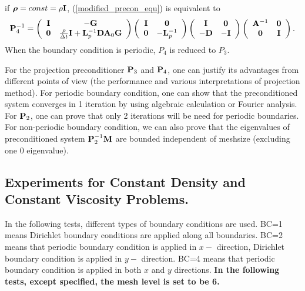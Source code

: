 \documentclass[9pt]{article}
\newcommand{\V}[1]{\boldsymbol{#1}}
\begin{document}
if ${\V {\rho}}=const=\rho {\bf I}$, (\ref{modified_precon_equ}) is equivalent to
\begin{equation}\label{modified_precon_equ}
{\bf P}_4^{-1}=\left(\begin{array}{cc}
{\bf I} & - {\bf G} \\
{\bf 0}      & \frac{\rho}{\Delta t}{\bf I}+{\bf L}_p^{-1} {\bf D} {\bf A}_0 {\bf G}
\end{array}\right)
\left(\begin{array}{cc}
{\bf I}     &  {\bf 0} \\
{\bf 0}     &  -{\bf L}_p^{-1}
\end{array}\right)
\left(\begin{array}{cc}
{\bf I}     &  {\bf 0} \\
-{\bf D}     &  -{\bf I}
\end{array}\right)
\left(\begin{array}{cc}
{\bf A}^{-1}       & {\bf 0} \\
{\bf 0}            & {\bf I}
\end{array}\right).
\end{equation}
When the boundary condition is periodic, $P_4$ is reduced to $P_3$.

For the projection preconditioner ${\bf P}_3$ and ${\bf P}_4$, one can justify its advantages from different points of view (the performance \cite{Griffith} and various interpretations of projection method). For periodic boundary condition, one can show that the preconditioned system converges in 1 iteration by using algebraic calculation or Fourier analysis. For ${\bf P}_2$, one can prove that only 2 iterations will be need for periodic boundaries. For non-periodic boundary condition, we can also prove that the eigenvalues of preconditioned system ${\bf P}_2^{-1} {\bf M}$ are bounded independent of meshsize (excluding one 0 eigenvalue).

\subsection{Experiments for Constant Density and Constant Viscosity Problems.}

In the following tests, different types of boundary conditions are used. BC=1 means Dirichlet
boundary conditions are applied along all boundaries. BC=2 means that periodic boundary condition is applied
in $x-$ direction, Dirichlet boundary condition is applied in $y-$ direction. BC=4 means that periodic
boundary condition is applied in both $x$ and $y$ directions. {\bf In the following tests, except specified, the mesh level is set to be 6.}
\end{document}
